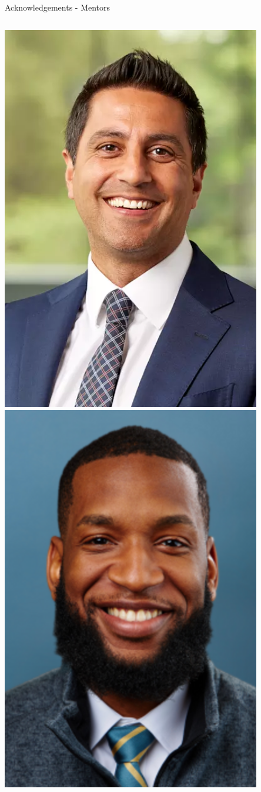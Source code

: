 \documentclass[aspectratio=169]{beamer}
\begin{document}
\begin{frame}{Acknowledgements - Mentors}
\begin{columns}
            \includegraphics[width=0.85\textwidth]{people/docs/cardoos.png}
            \includegraphics[width=0.85\textwidth]{people/docs/chukwueloka.png}

\end{columns}
\end{frame}
\end{document}
